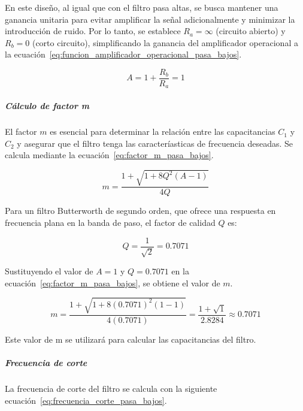                     En este diseño, al igual que con el filtro pasa altas, se busca mantener una ganancia unitaria para evitar amplificar la señal adicionalmente y minimizar la introducción de ruido. Por lo tanto, se establece $R_a = \infty$ (circuito abierto) y $R_b = 0$ (corto circuito), simplificando la ganancia del amplificador operacional a la ecuación~\ref{eq:funcion_amplificador_operacional_pasa_bajos}.

                    \begin{equation}
                        \label{eq:funcion_amplificador_operacional_pasa_bajos}
                        A = 1 + \frac{R_b}{R_a} = 1
                    \end{equation}

                \subparagraph{Cálculo de factor m}
                    El factor $m$ es esencial para determinar la relación entre las capacitancias $C_1$ y $C_2$ y asegurar que el filtro tenga las caracteríasticas de frecuencia deseadas. Se calcula mediante la ecuación~\ref{eq:factor_m_pasa_bajos}.

                    \begin{equation}
                        \label{eq:factor_m_pasa_bajos}
                        m = \frac{1+\sqrt{1+8Q^2(A-1)}}{4Q}
                    \end{equation}

                    Para un filtro Butterworth de segundo orden, que ofrece una respuesta en frecuencia plana en la banda de paso, el factor de calidad $Q$ es:

                    \begin{equation}
                        Q = \frac{1}{\sqrt{2}} = 0.7071
                    \end{equation}

                    Sustituyendo el valor de $A = 1$ y $Q = 0.7071$ en la ecuación~\ref{eq:factor_m_pasa_bajos}, se obtiene el valor de $m$.

                    \begin{equation}
                        \label{eq:factor_m_pasa_bajos_valor}
                        m = \frac{1+\sqrt{1+8(0.7071)^2(1-1)}}{4(0.7071)} = \frac{1 + \sqrt{1}}{2.8284}\approx 0.7071
                    \end{equation}

                    Este valor de m se utilizará para calcular las capacitancias del filtro.

                \subparagraph{Frecuencia de corte}
                    La frecuencia de corte del filtro se calcula con la siguiente ecuación~\ref{eq:frecuencia_corte_pasa_bajos}.

